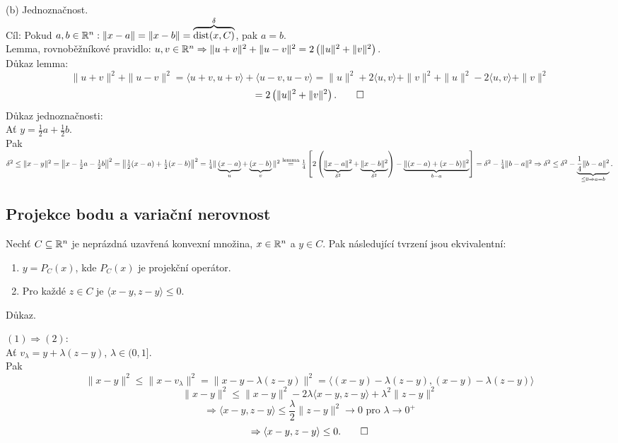 (b) Jednoznačnost.\\
Cíl: Pokud $a,b \in \mathbb{R}^n : \|x-a\| = \|x-b\| = \overbrace{\operatorname*{dist}(x,C)}^\delta$, pak $a=b$.\\
Lemma, rovnoběžníkové pravidlo: $u,v \in \mathbb{R}^n \Rightarrow \|u+v\|^2 + \|u-v\|^2 = 2\left(\|u\|^2 + \|v\|^2\right)$.\\
Důkaz lemma: 
\[
    \|u+v\|^2 + \|u-v\|^2 = \langle u+v, u+v \rangle + \langle u-v, u-v \rangle = \|u\|^2 + 2 \langle u, v \rangle + 
    \|v\|^2 + \|u\|^2 - 2 \langle u, v \rangle + \|v\|^2
\] 
\[
    = 2\left( \|u\|^2 + \|v\|^2 \right) \text{.} \qed
\]
Důkaz jednoznačnosti:\\
Ať $y = \frac{1}{2}a + \frac{1}{2}b$. \\
Pak $\delta^2 \leq \|x-y\|^2 = \left\|x-\frac{1}{2}a - \frac{1}{2}b\right\|^2 = \left\|\frac{1}{2}(x-a) + 
\frac{1}{2}(x-b)\right\|^2 = \frac{1}{4}\|\underbrace{(x-a)}_{u} + \underbrace{(x-b)}_{v}\|^2 \\ 
\stackrel{\text{lemma}}{=} \frac{1}{4} \left[ 2 \left(\underbrace{\|x-a\|^2}_{\delta^2} + 
\underbrace{\|x-b\|^2}_{\delta^2}\right) - \underbrace{\|(x-a) + (x-b)\|^2}_{b-a}\right] = \delta^2 - 
\frac{1}{4} \|b-a\|^2 \Rightarrow \delta^2 \leq \delta^2 - \underbrace{\frac{1}{4} \|b-a\|^2}_{\leq 0 \Rightarrow a=b} 
\text{.}$

\subsection{Projekce bodu a variační nerovnost}\label{varNer}
Nechť $C \subseteq \mathbb{R}^n$ je neprázdná uzavřená konvexní množina, $x \in \mathbb{R}^n$ a $y \in C$. Pak následující tvrzení jsou
ekvivalentní:
\begin{enumerate}[(1)]
    \item $y = P_C (x)$, kde $P_C(x)$ je projekční operátor.
    \item Pro každé $z \in C$ je $\langle x-y, z-y \rangle \leq 0$. 
\end{enumerate}

Důkaz.

$(1) \Rightarrow (2)$:\\
Ať $v_\lambda = y + \lambda(z-y)$, $\lambda \in (0,1]$.\\
Pak
\[
    \|x-y\|^2 \leq \|x-v_\lambda\|^2 = \|x-y-\lambda(z-y)\|^2 = \langle (x-y) - \lambda(z-y), (x-y) - \lambda(z-y)\rangle 
\]
\[
    \|x-y\|^2 \leq \|x-y\|^2 - 2 \lambda \langle x-y, z-y\rangle + \lambda^2 \|z-y\|^2
\]
\[
    \Rightarrow \langle x-y, z-y\rangle \leq \frac{\lambda}{2} \|z-y\|^2 \rightarrow 0 \text{ pro } \lambda \rightarrow 0^+
\]
\[
    \Rightarrow \langle x-y, z-y\rangle \leq 0 \text{.} \qed
\]

